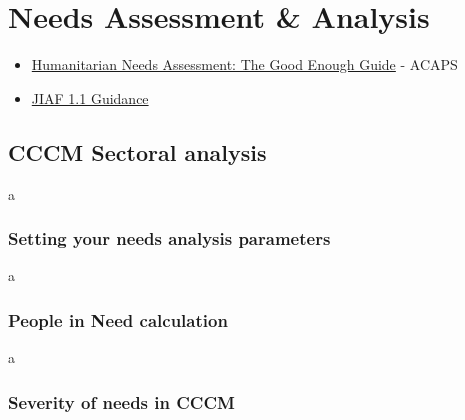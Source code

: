 \documentclass[
  a4paper,
  onecolumn,
  oneside]{book}
\providecommand{\tightlist}{%
  \setlength{\itemsep}{0pt}\setlength{\parskip}{0pt}}\usepackage{longtable,booktabs,array}
\begin{document}
\hypertarget{needs-assessment-analysis}{%
\chapter{Needs Assessment \& Analysis}\label{needs-assessment-analysis}}

\begin{tcolorbox}[enhanced jigsaw, colframe=quarto-callout-tip-color-frame, title=\textcolor{quarto-callout-tip-color}{\faLightbulb}\hspace{0.5em}{Recommended reading}, toptitle=1mm, toprule=.15mm, colbacktitle=quarto-callout-tip-color!10!white, breakable, arc=.35mm, coltitle=black, bottomrule=.15mm, titlerule=0mm, opacityback=0, rightrule=.15mm, bottomtitle=1mm, leftrule=.75mm, left=2mm, opacitybacktitle=0.6, colback=white]

\begin{itemize}
\tightlist
\item
  \href{files/humanitarian_needs_assessment-the_good_enough_guide_2014.pdf}{Humanitarian
  Needs Assessment: The Good Enough Guide} - ACAPS
\item
  \href{files/4.\%20HPC_2023-JIAF_Guide\%201.1.pdf}{JIAF 1.1 Guidance}
\end{itemize}

\end{tcolorbox}

\hypertarget{cccm-sectoral-analysis}{%
\section{CCCM Sectoral analysis}\label{cccm-sectoral-analysis}}

a

\hypertarget{setting-your-needs-analysis-parameters}{%
\subsection{Setting your needs analysis
parameters}\label{setting-your-needs-analysis-parameters}}

a

\hypertarget{people-in-need-calculation}{%
\subsection{People in Need
calculation}\label{people-in-need-calculation}}

a

\hypertarget{severity-of-needs-in-cccm}{%
\subsection{Severity of needs in CCCM}\label{severity-of-needs-in-cccm}}
\end{document}
